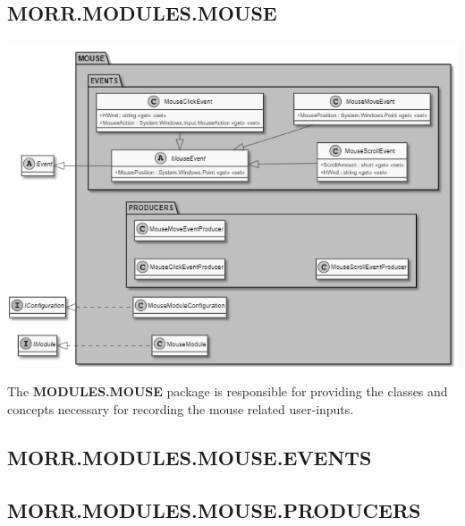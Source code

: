 \newpage
\subsection*{MORR.MODULES.MOUSE}

\begin{center}
    \includegraphics[width=1.0\textwidth]{resources/Packages/MODULES_MOUSE.png}
\end{center}

The \textbf{MODULES.MOUSE} package is responsible for providing the classes and concepts necessary for recording the mouse related user-inputs.

\begin{packclass}
\end{packclass}

\begin{packpack}
\end{packpack}

\subsection*{MORR.MODULES.MOUSE.EVENTS}
\begin{packclass}
\end{packclass}

\subsection*{MORR.MODULES.MOUSE.PRODUCERS}
\begin{packclass}
\end{packclass}

